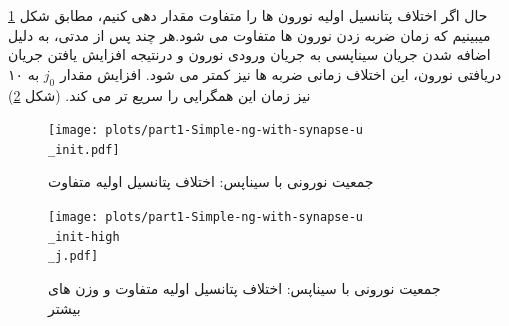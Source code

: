 \documentclass{report}
\begin{document}
        حال اگر اختلاف پتانسیل اولیه نورون ها را متفاوت مقدار دهی کنیم، مطابق شکل
        \ref{fig:part1-simple-ng-with-synapse-u-init}
        میبینیم که زمان ضربه زدن نورون ها متفاوت می شود.هر چند پس از مدتی، به دلیل اضافه شدن جریان سیناپسی به جریان ورودی نورون و درنتیجه افزایش یافتن جریان دریافتی نورون، این اختلاف زمانی ضربه ها نیز کمتر می شود. افزایش مقدار 
        $j_0$ 
        به ۱۰ نیز زمان این همگرایی را سریع تر می کند.
        (شکل \ref{fig:part1-simple-ng-with-synapse-u-init-high-j})
        \begin{figure}[!ht]
            \centering
            \texttt{[image: plots/part1-Simple-ng-with-synapse-u\\\_init.pdf]} 
            \caption{جمعیت نورونی با سیناپس: اختلاف پتانسیل اولیه متفاوت}
            \label{fig:part1-simple-ng-with-synapse-u-init}
        \end{figure}
        \begin{figure}[!ht]
            \centering
            \texttt{[image: plots/part1-Simple-ng-with-synapse-u\\\_init-high\\\_j.pdf]} 
            \caption{جمعیت نورونی با سیناپس: اختلاف پتانسیل اولیه متفاوت و وزن های بیشتر}
            \label{fig:part1-simple-ng-with-synapse-u-init-high-j}
        \end{figure}
\end{document}
